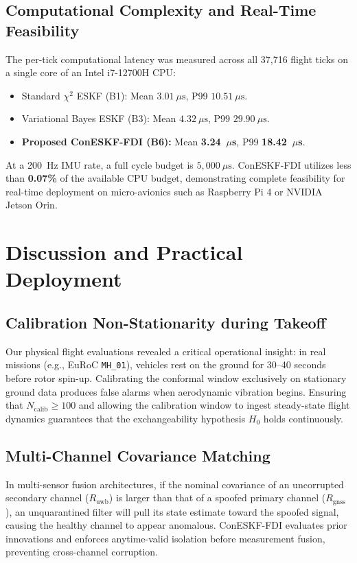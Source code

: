 \documentclass[journal,twocolumn]{IEEEtran}
\begin{document}
\subsection{Computational Complexity and Real-Time Feasibility}
The per-tick computational latency was measured across all 37,716 flight ticks on a single core of an Intel i7-12700H CPU:
\begin{itemize}
    \item Standard $\chi^2$ ESKF (B1): Mean $3.01\ \mu\text{s}$, P99 $10.51\ \mu\text{s}$.
    \item Variational Bayes ESKF (B3): Mean $4.32\ \mu\text{s}$, P99 $29.90\ \mu\text{s}$.
    \item \textbf{Proposed ConESKF-FDI (B6):} Mean \textbf{3.24~$\mu$s}, P99 \textbf{18.42~$\mu$s}.
\end{itemize}
At a 200~Hz IMU rate, a full cycle budget is $5,000\ \mu\text{s}$. ConESKF-FDI utilizes less than \textbf{0.07\%} of the available CPU budget, demonstrating complete feasibility for real-time deployment on micro-avionics such as Raspberry Pi 4 or NVIDIA Jetson Orin.

\section{Discussion and Practical Deployment}
\label{sec:discussion}
\subsection{Calibration Non-Stationarity during Takeoff}
Our physical flight evaluations revealed a critical operational insight: in real missions (e.g., EuRoC \texttt{MH\_01}), vehicles rest on the ground for 30--40 seconds before rotor spin-up. Calibrating the conformal window exclusively on stationary ground data produces false alarms when aerodynamic vibration begins. Ensuring that $N_{\text{calib}} \ge 100$ and allowing the calibration window to ingest steady-state flight dynamics guarantees that the exchangeability hypothesis $H_0$ holds continuously.

\subsection{Multi-Channel Covariance Matching}
In multi-sensor fusion architectures, if the nominal covariance of an uncorrupted secondary channel ($R_{\text{uwb}}$) is larger than that of a spoofed primary channel ($R_{\text{gnss}}$), an unquarantined filter will pull its state estimate toward the spoofed signal, causing the healthy channel to appear anomalous. ConESKF-FDI evaluates prior innovations and enforces anytime-valid isolation before measurement fusion, preventing cross-channel corruption.
\end{document}
